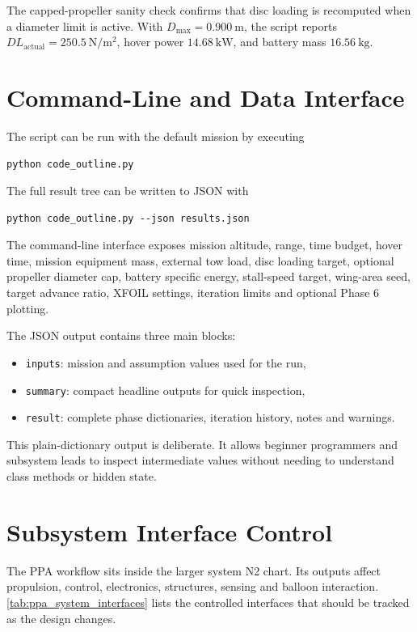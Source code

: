 The capped-propeller sanity check confirms that disc loading is recomputed when a diameter limit is active. With \(D_{\max}=0.900~\mathrm{m}\), the script reports \(DL_{\mathrm{actual}}=250.5~\mathrm{N/m^2}\), hover power \(14.68~\mathrm{kW}\), and battery mass \(16.56~\mathrm{kg}\).

\section{Command-Line and Data Interface}
\label{sec:ppa_cli}

The script can be run with the default mission by executing
\begin{verbatim}
python code_outline.py
\end{verbatim}
The full result tree can be written to JSON with
\begin{verbatim}
python code_outline.py --json results.json
\end{verbatim}
The command-line interface exposes mission altitude, range, time budget, hover time, mission equipment mass, external tow load, disc loading target, optional propeller diameter cap, battery specific energy, stall-speed target, wing-area seed, target advance ratio, XFOIL settings, iteration limits and optional Phase 6 plotting.

The JSON output contains three main blocks:
\begin{itemize}[leftmargin=*]
    \item \texttt{inputs}: mission and assumption values used for the run,
    \item \texttt{summary}: compact headline outputs for quick inspection,
    \item \texttt{result}: complete phase dictionaries, iteration history, notes and warnings.
\end{itemize}
This plain-dictionary output is deliberate. It allows beginner programmers and subsystem leads to inspect intermediate values without needing to understand class methods or hidden state.

\section{Subsystem Interface Control}
\label{sec:ppa_subsystem_interfaces}

The PPA workflow sits inside the larger system N2 chart. Its outputs affect propulsion, control, electronics, structures, sensing and balloon interaction. \autoref{tab:ppa_system_interfaces} lists the controlled interfaces that should be tracked as the design changes.

